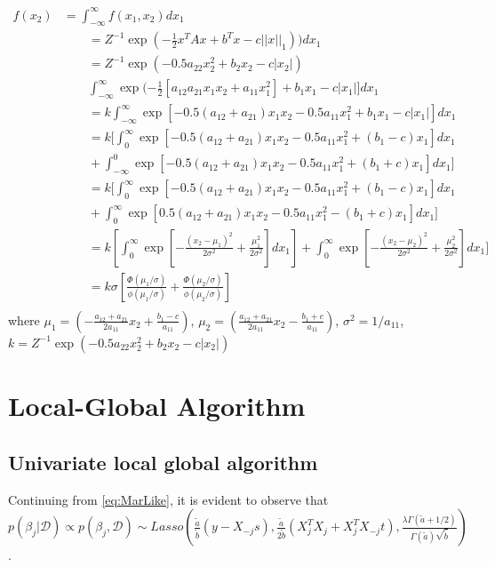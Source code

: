 $$
\begin{array}{rl}
	f(x_2)
	& =  \int_{-\infty}^{\infty} f(x_1,x_2)dx_1 \\
	& \qquad
	= Z^{-1}\exp(-\frac{1}{2}x^TAx + b^Tx - c||x||_1))dx_1 \\
	& \qquad
	= Z^{-1}\exp(-0.5 a_{22}x_2^2 + b_2x_2 - c|x_2|) \\
	& \qquad
	\int_{-\infty}^{\infty}\exp(-\frac{1}{2} [a_{12}a_{21}x_1x_2 + a_{11}x_1^2] + b_1x_1 - c|x_1|]dx_1\\
	& \qquad
	= k \int_{-\infty}^{\infty} \exp[-0.5(a_{12}+a_{21})x_1x_2 -0.5a_{11}x_1^2 + b_1x_1 - c|x_1|]dx_1\\
	& \qquad
	= k[ \int_{0}^{\infty} \exp[-0.5(a_{12}+a_{21})x_1x_2 - 0.5a_{11}x_1^2 + (b_1 - c)x_1 ]dx_1  \\
	& \qquad
	+\int_{-\infty}^{0}\exp[-0.5(a_{12}+a_{21})x_1x_2  - 0.5a_{11}x_1^2  + (b_1 + c)x_1]dx_1 ]\\
	& \qquad
	= k[ \int_{0}^{\infty} \exp[-0.5(a_{12}+a_{21})x_1x_2 - 0.5a_{11}x_1^2 + (b_1 - c)x_1 ]dx_1  \\
	& \qquad
	+\int_{0}^{\infty} \exp[0.5(a_{12}+a_{21})x_1x_2  - 0.5a_{11}x_1^2  - (b_1+c)x_1]dx_1 ]\\
	& \qquad
	= k[\int_{0}^{\infty} \exp[-\frac{(x_2-\mu_1)^2}{2\sigma^2} + \frac{\mu_1^2}{2\sigma^2}]dx_1] + \int_{0}^{\infty} \exp[-\frac{(x_2-\mu_2)^2}{2\sigma^2} + \frac{\mu_2^2}{2\sigma^2}]dx_1] \\
	& \qquad
	= k \sigma[\frac{\Phi(\mu_1/\sigma)}{\phi(\mu_1/\sigma)} +
	\frac{\Phi(\mu_2/\sigma)}{\phi(\mu_2/\sigma)}]  \\
	
\end{array}
$$
where $\mu_1 = (-\frac{a_{12}+a_{21}}{2a_{11}}x_2 + \frac{b_1-c}{a_{11}}) $, $\mu_2 =(\frac{a_{12}+a_{21}}{2a_{11}}x_2 - \frac{b_1+c}{a_{11}}) $, $\sigma^2 = 1/a_{11}$, $k =  Z^{-1}\exp(-0.5a_{22}x_2^2 + b_2x_2 - c|x_2|)$


\section{Local-Global Algorithm}
\subsection{Univariate local global algorithm}
Continuing from \autoref{eq:MarLike}, it is evident to observe that $p(\beta_j|\mathcal{D}) \propto p(\beta_j,\mathcal{D}) \sim Lasso(\frac{\tilde{a}}{\tilde{b}}(y - X_{-j}s), \frac{\tilde{a}}{2\tilde{b}}(X_j^TX_j+X_j^TX_{-j}t) , \frac{\lambda \Gamma(\tilde{a}+1/2)}{\Gamma(\tilde{a})\sqrt{\tilde{b}  }}) $.

